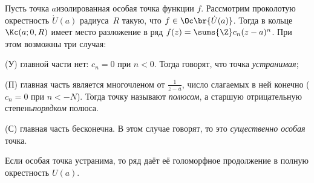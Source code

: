 \documentclass[a4paper]{article}
\begin{document}
\begin{df}
Пусть точка $a$\т изолированная особая точка функции $f$. Рассмотрим проколотую
окрестность $\dot{U}(a)$ радиуса~$R$ такую, что $f \in \Oc\br{\dot{U}(a)}$. Тогда в кольце $\Kc(a;0,R)$
имеет место разложение в ряд $f(z)=\sums{\Z}c_n(z-a)^n$. При этом возможны три случая:

\begin{items}{-2}
\item[(У)]\т главной части нет: $c_n=0$ при $n<0$. Тогда говорят, что точка \emph{устранимая};
\item[(П)]\т главная часть является многочленом от $\frac{1}{z-a}$,  число слагаемых в ней
конечно ($c_n=0$ при $n<-N$). Тогда точку называют \emph{полюсом}, а старшую отрицательную
степень\т \emph{порядком} полюса.
\item[(С)]\т главная часть бесконечна. В этом случае говорят, то это \emph{существенно особая} точка.
\end{items}
\end{df}

Если особая точка устранима, то ряд даёт её голоморфное продолжение в полную окрестность $U(a)$.
\end{document}
